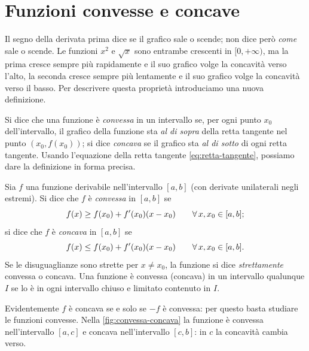 \section{Funzioni convesse e concave}
\label{sec:convessita}

Il segno della derivata prima dice se il grafico sale o scende; non dice però
\emph{come} sale o scende. Le funzioni $x^{2}$ e $\sqrt x$ sono entrambe crescenti in
$[0,+\infty)$, ma la prima cresce sempre più rapidamente e il suo grafico volge la
concavità verso l'alto, la seconda cresce sempre più lentamente e il suo grafico volge
la concavità verso il basso. Per descrivere questa proprietà introduciamo una nuova
definizione.

Si dice che una funzione è \emph{convessa} in un intervallo se, per ogni punto
$x_{0}$ dell'intervallo, il grafico della funzione sta \emph{al di sopra} della retta
tangente nel punto $(x_{0},f(x_{0}))$; si dice \emph{concava} se il grafico sta \emph{al di
sotto} di ogni retta tangente. Usando l'equazione della retta tangente
\eqref{eq:retta-tangente}, possiamo dare la definizione in forma precisa.

\begin{definizione}\label{def:convessa}
Sia $f$ una funzione derivabile nell'intervallo $[a,b]$ (con derivate unilaterali negli
estremi). Si dice che $f$ è \emph{convessa} in $[a,b]$ se
\begin{equation}\label{eq:convessa}
  f(x)\ge f(x_{0})+f'(x_{0})(x-x_{0}) \qquad\forall\, x,x_{0}\in[a,b];
\end{equation}
si dice che $f$ è \emph{concava} in $[a,b]$ se
\begin{equation}\label{eq:concava}
  f(x)\le f(x_{0})+f'(x_{0})(x-x_{0}) \qquad\forall\, x,x_{0}\in[a,b].
\end{equation}
Se le disuguaglianze sono strette per $x\neq x_{0}$, la funzione si dice
\emph{strettamente} convessa o concava. Una funzione è convessa (concava) in un
intervallo qualunque $I$ se lo è in ogni intervallo chiuso e limitato contenuto in $I$.
\end{definizione}

Evidentemente $f$ è concava se e solo se $-f$ è convessa: per questo basta
studiare le funzioni convesse. Nella \cref{fig:convessa-concava} la funzione è convessa
nell'intervallo $[a,c]$ e concava nell'intervallo $[c,b]$: in $c$ la concavità cambia
verso.

